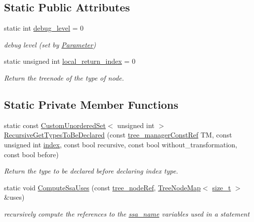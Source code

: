 \subsection*{Static Public Attributes}
\begin{DoxyCompactItemize}
\item 
static int \hyperlink{classtree__helper_a5492ea6667264979227f69dc19bcd593}{debug\+\_\+level} = 0
\begin{DoxyCompactList}\small\item\em debug level (set by \hyperlink{classParameter}{Parameter}) \end{DoxyCompactList}\item 
static unsigned int \hyperlink{classtree__helper_a8b5eaad0abef101ef9c92076671efa62}{local\+\_\+return\+\_\+index} = 0
\begin{DoxyCompactList}\small\item\em Return the treenode of the type of node. \end{DoxyCompactList}\end{DoxyCompactItemize}
\subsection*{Static Private Member Functions}
\begin{DoxyCompactItemize}
\item 
static const \hyperlink{classCustomUnorderedSet}{Custom\+Unordered\+Set}$<$ unsigned int $>$ \hyperlink{classtree__helper_a0f1604823bf63206a17b132f605b90ed}{Recursive\+Get\+Types\+To\+Be\+Declared} (const \hyperlink{tree__manager_8hpp_a792e3f1f892d7d997a8d8a4a12e39346}{tree\+\_\+manager\+Const\+Ref} TM, const unsigned int \hyperlink{tutorial__pact__2019_2Introduction_2third_2include_2Keccak_8h_a028c9bdc8344cca38ab522a337074797}{index}, const bool recursive, const bool without\+\_\+transformation, const bool before)
\begin{DoxyCompactList}\small\item\em Return the type to be declared before declaring index type. \end{DoxyCompactList}\item 
static void \hyperlink{classtree__helper_a89952195432e48a6beba86df47fa88c7}{Compute\+Ssa\+Uses} (const \hyperlink{tree__node_8hpp_a6ee377554d1c4871ad66a337eaa67fd5}{tree\+\_\+node\+Ref}, \hyperlink{classTreeNodeMap}{Tree\+Node\+Map}$<$ \hyperlink{tutorial__fpt__2017_2intro_2sixth_2test_8c_a7c94ea6f8948649f8d181ae55911eeaf}{size\+\_\+t} $>$ \&uses)
\begin{DoxyCompactList}\small\item\em recursively compute the references to the \hyperlink{structssa__name}{ssa\+\_\+name} variables used in a statement \end{DoxyCompactList}\end{DoxyCompactItemize}
